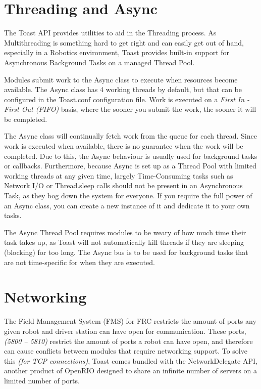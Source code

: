 \documentclass[a4paper,12pt]{article}
\begin{document}
\newpage

\section{Threading and Async}
The Toast API provides utilities to aid in the Threading process. As Multithreading is something hard to get right and can easily get out of hand, especially in a Robotics environment, Toast provides built-in support for Asynchronous Background Tasks on a managed Thread Pool.

Modules submit work to the Async class to execute when resources become available. The Async class has 4 working threads by default, but that can be configured in the Toast.conf configuration file. Work is executed on a \textit{First In - First Out (FIFO)} basis, where the sooner you submit the work, the sooner it will be completed.

The Async class will continually fetch work from the queue for each thread. Since work is executed when available, there is no guarantee when the work will be completed. Due to this, the Async behaviour is usually used for background tasks or callbacks. Furthermore, because Async is set up as a Thread Pool with limited working threads at any given time, largely Time-Consuming tasks such as Network I/O or Thread.sleep calls should not be present in an Asynchronous Task, as they bog down the system for everyone. If you require the full power of an Async class, you can create a new instance of it and dedicate it to your own tasks.

The Async Thread Pool requires modules to be weary of how much time their task takes up, as Toast will not automatically kill threads if they are sleeping (blocking) for too long. The Async bus is to be used for background tasks that are not time-specific for when they are executed.

\newpage

\section{Networking}
The Field Management System (FMS) for FRC restricts the amount of ports any given robot and driver station can have open for communication. These ports, \textit{(5800 -- 5810)} restrict the amount of ports a robot can have open, and therefore can cause conflicts between modules that require networking support. To solve this \textit{(for TCP connections)}, Toast comes bundled with the NetworkDelegate API, another product of OpenRIO designed to share an infinite number of servers on a limited number of ports. 
\end{document}
